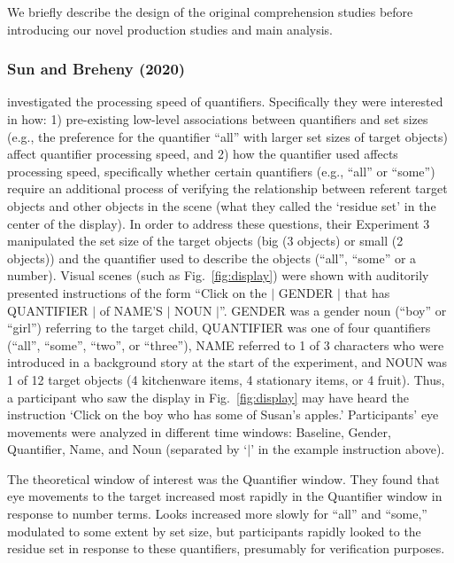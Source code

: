 \documentclass[10pt,letterpaper]{article}
\newcommand{\figref}[1]{Fig.~\ref{#1}}
\begin{document}
We briefly describe the design of the original comprehension studies before introducing our novel production studies and main analysis.

\subsubsection{Sun and Breheny (2020)} investigated the processing speed of quantifiers. Specifically they were interested in how: 1) pre-existing low-level associations between quantifiers and set sizes (e.g., the preference for the quantifier “all” with larger set sizes of target objects) affect quantifier processing speed, and 2) how the quantifier used affects processing speed, specifically whether certain quantifiers (e.g., “all” or “some”) require an additional process of verifying the relationship between referent target objects and other objects in the scene (what they called the `residue set' in the center of the display). In order to address these questions, their Experiment 3 manipulated the set size of the target objects (big (3 objects) or small (2 objects)) and the quantifier used to describe the objects (“all”, “some” or a number). Visual scenes (such as \figref{fig:display}) were shown with auditorily presented instructions of the form “Click on the $|$ GENDER $|$ that has QUANTIFIER $|$ of NAME’S $|$ NOUN $|$”. GENDER was a gender noun (``boy'' or ``girl'') referring to the target child, QUANTIFIER was one of four quantifiers (“all”, “some”, “two”, or “three”), NAME referred to 1 of 3 characters who were introduced in a background story at the start of the experiment, and NOUN was 1 of 12 target objects (4 kitchenware items, 4 stationary items, or 4 fruit). Thus, a participant who saw the display in \figref{fig:display} may have heard the instruction `Click on the boy who has some of Susan's apples.' Participants' eye movements were analyzed in different time windows: Baseline, Gender, Quantifier, Name, and Noun (separated by `$|$' in the example instruction above). 

The theoretical window of interest was the Quantifier window. They found that eye movements to the target increased most rapidly in the Quantifier window in response to number terms. Looks increased more slowly for ``all'' and ``some,'' modulated to some extent by set size, but participants rapidly looked to the residue set in response to these quantifiers, presumably for verification purposes.
\end{document}
